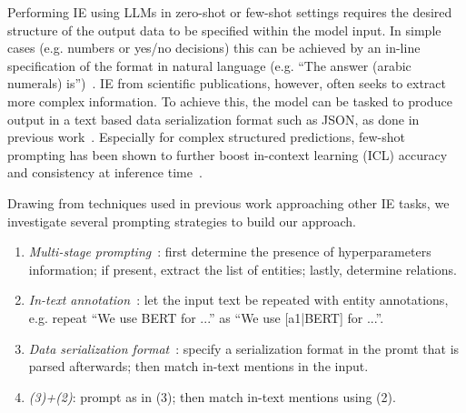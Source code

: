 
Performing IE using LLMs in zero-shot or few-shot settings requires the desired structure of the output data to be specified within the model input. In simple cases (e.g. numbers or yes/no decisions) this can be achieved by an in-line specification of the format in natural language (e.g. ``The answer (arabic numerals) is'')~\cite{Kojima2022}. IE from scientific publications, however, often seeks to extract more complex information. To achieve this, the model can be tasked to produce output in a text based data serialization format such as JSON, as done in previous work~\cite{Dunn2022}. Especially for complex structured predictions, few-shot prompting has been shown to further boost in-context learning (ICL) accuracy and consistency at inference time~\cite{Brown2020gpt3}.

Drawing from techniques used in previous work approaching other IE tasks, we investigate several prompting strategies to build our approach.
%
%

\begin{enumerate}
    \item \textit{Multi-stage prompting}~\cite{Polak2023}: first determine the presence of hyperparameters information; if present, extract the list of entities; lastly, determine relations.
    \item \textit{In-text annotation}~\cite{Wang2023}: let the input text be repeated with entity annotations, e.g. repeat ``We use BERT for ...'' as ``We use [a1|BERT] for ...''. %
    \item \textit{Data serialization format}~\cite{Dunn2022}: specify a serialization format in the promt that is parsed afterwards; then match in-text mentions in the input.
    \item \textit{(3)+(2)}: prompt as in (3); then match in-text mentions using (2).
\end{enumerate}

